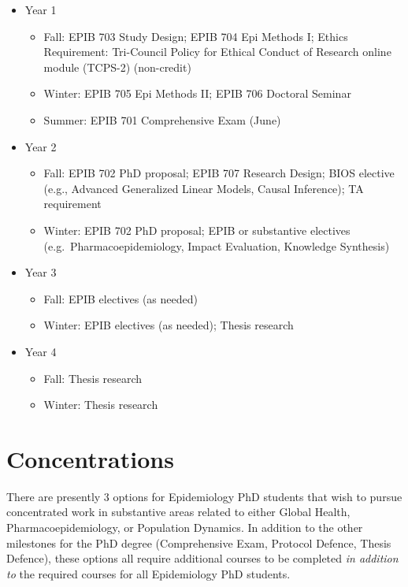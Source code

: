 \documentclass[
  letterpaper,
  DIV=11,
  numbers=noendperiod]{scrreprt}
\providecommand{\tightlist}{%
  \setlength{\itemsep}{0pt}\setlength{\parskip}{0pt}}
\begin{document}
\begin{itemize}
\tightlist
\item
  Year 1

  \begin{itemize}
  \tightlist
  \item
    Fall: EPIB 703 Study Design; EPIB 704 Epi Methods I; Ethics
    Requirement: Tri-Council Policy for Ethical Conduct of Research
    online module (TCPS-2) (non-credit)\\
  \item
    Winter: EPIB 705 Epi Methods II; EPIB 706 Doctoral Seminar
  \item
    Summer: EPIB 701 Comprehensive Exam (June)
  \end{itemize}
\item
  Year 2

  \begin{itemize}
  \tightlist
  \item
    Fall: EPIB 702 PhD proposal; EPIB 707 Research Design; BIOS elective
    (e.g., Advanced Generalized Linear Models, Causal Inference); TA
    requirement
  \item
    Winter: EPIB 702 PhD proposal; EPIB or substantive electives
    (e.g.~Pharmacoepidemiology, Impact Evaluation, Knowledge Synthesis)
  \end{itemize}
\item
  Year 3

  \begin{itemize}
  \tightlist
  \item
    Fall: EPIB electives (as needed)
  \item
    Winter: EPIB electives (as needed); Thesis research
  \end{itemize}
\item
  Year 4

  \begin{itemize}
  \tightlist
  \item
    Fall: Thesis research
  \item
    Winter: Thesis research
  \end{itemize}
\end{itemize}


\chapter{Concentrations}\label{concentrations}

There are presently 3 options for Epidemiology PhD students that wish to
pursue concentrated work in substantive areas related to either Global
Health, Pharmacoepidemiology, or Population Dynamics. In addition to the
other milestones for the PhD degree (Comprehensive Exam, Protocol
Defence, Thesis Defence), these options all require additional courses
to be completed \emph{in addition to} the required courses for all
Epidemiology PhD students.
\end{document}

